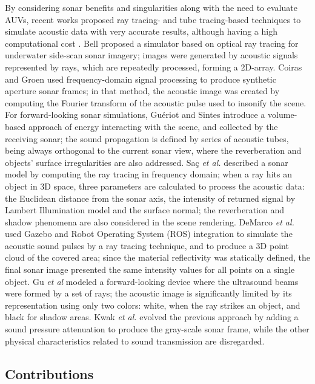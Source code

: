 \documentclass[final,5p,times]{elsarticle}
\begin{document}
By considering sonar benefits and singularities along with the need to evaluate AUVs, recent works proposed ray tracing- and tube tracing-based techniques to simulate acoustic data with very accurate results, although having a high computational cost \cite{bell1997,coiras2009,gueriot2010,sac2015,demarco2015,gu2013,kwak2015}. Bell \cite{bell1997} proposed a simulator based on optical ray tracing for underwater side-scan sonar imagery; images were generated by acoustic signals represented by rays, which are repeatedly processed, forming a 2D-array. Coiras and Groen \cite{coiras2009} used frequency-domain signal processing to produce synthetic aperture sonar frames; in that method, the acoustic image was created by computing the Fourier transform of the acoustic pulse used to insonify the scene. For forward-looking sonar simulations, Guériot and Sintes \cite{gueriot2010} introduce a volume-based approach of energy interacting with the scene, and collected by the receiving sonar; the sound propagation is defined by series of acoustic tubes, being always orthogonal to the current sonar view, where the reverberation and objects' surface irregularities are also addressed. Saç \textit{et al.} \cite{sac2015} described a sonar model by computing the ray tracing in frequency domain; when a ray hits an object in 3D space, three parameters are calculated to process the acoustic data: the Euclidean distance from the sonar axis, the intensity of returned signal by Lambert Illumination model and the surface normal; the reverberation and shadow phenomena are also considered in the scene rendering. DeMarco \textit{et al.} \cite{demarco2015} used Gazebo and Robot Operating System (ROS) \cite{quigley2009} integration to simulate the acoustic sound pulses by a ray tracing technique, and to produce a 3D point cloud of the covered area; since the material reflectivity was statically defined, the final sonar image presented the same intensity values for all points on a single object. Gu \textit{et al} \cite{gu2013} modeled a forward-looking device where the ultrasound beams were formed by a set of rays; the acoustic image is significantly limited by its representation using only two colors: white, when the ray strikes an object, and black for shadow areas. Kwak \textit{et al.} \cite{kwak2015} evolved the previous approach by adding a sound pressure attenuation to produce the gray-scale sonar frame, while the other physical characteristics related to sound transmission are disregarded.

\subsection{Contributions}
\end{document}
